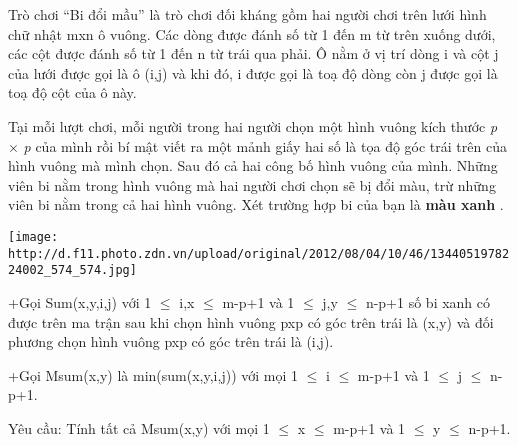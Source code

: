 Trò chơi “Bi đổi mầu” là trò chơi đối kháng gồm hai người chơi trên lưới hình chữ nhật                                                   mxn ô vuông. Các dòng được đánh số từ 1 đến    m từ trên xuống dưới, các cột được đánh số từ 1 đến    n từ trái qua phải. Ô nằm ở vị trí dòng    i và cột j    của lưới được gọi là ô (i,j) và khi đó, i được gọi là toạ độ dòng còn j được gọi là toạ độ cột của ô này.  

   Tại mỗi lượt chơi, mỗi người trong hai người chọn một hình vuông kích thước   \emph{    p   }   ×   \emph{    p   }   của mình rồi bí mật viết ra một mảnh giấy hai số là tọa độ góc trái trên của hình vuông mà mình chọn. Sau đó cả hai công bố hình vuông của mình. Những viên bi nằm trong hình vuông mà hai người chơi chọn sẽ bị đổi màu, trừ những viên bi nằm trong cả hai hình vuông. Xét trường hợp bi của bạn là   \textbf{    màu xanh   }   .  




\texttt{[image: http://d.f11.photo.zdn.vn/upload/original/2012/08/04/10/46/1344051978224002\_574\_574.jpg]}

   +Gọi Sum(x,y,i,j) với 1 $\le$ i,x $\le$ m-p+1 và 1 $\le$ j,y $\le$ n-p+1 số bi xanh có được trên ma trận sau khi chọn hình vuông pxp có góc trên trái là (x,y) và đối phương chọn hình vuông pxp có góc trên trái là (i,j).  

   +Gọi Msum(x,y) là min(sum(x,y,i,j)) với mọi 1 $\le$ i $\le$ m-p+1 và 1 $\le$ j $\le$ n-p+1.  

   Yêu cầu: Tính tất cả Msum(x,y) với mọi 1 $\le$ x $\le$ m-p+1 và 1 $\le$ y $\le$ n-p+1.